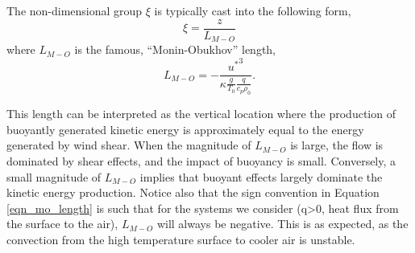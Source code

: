 The non-dimensional group $\xi$ is typically cast into the following 
form, 
\begin{equation}
 \xi = \frac{z}{L_{M-O}}
\end{equation}
where $L_{M-O}$ is the famous, ``Monin-Obukhov'' length,
\begin{equation}
 L_{M-O} = -\frac{{u^*}^3}{\kappa \frac{g}{T_0} \frac{q}{c_p \rho_0}}. 
  \label{eqn_mo_length}
\end{equation}

This length can be interpreted as the vertical location
where the production of buoyantly generated kinetic energy is
approximately equal to the energy generated by wind shear. When the
magnitude of $L_{M-O}$ is large, the flow is dominated by shear effects,
and the impact of buoyancy is small. Conversely, a small magnitude of
$L_{M-O}$ implies that buoyant effects largely dominate the kinetic
energy production. Notice also that the sign convention in Equation
\ref{eqn_mo_length} is such that for the systems we consider (q>0, heat
flux from the surface to the air), $L_{M-O}$ will always be
negative. This is as expected, as the convection from the high
temperature surface to cooler air is unstable. 

